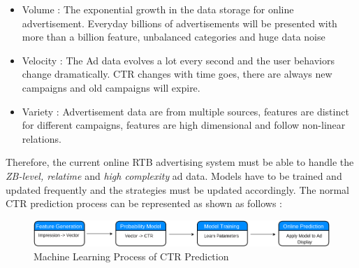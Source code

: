 \begin{itemize}
  \item Volume : The exponential growth in the data storage for online advertisement. Everyday billions of advertisements will be presented with more than a billion feature, unbalanced categories and huge data noise
  \item Velocity : The Ad data evolves a lot every second and the user behaviors change dramatically. CTR changes with time goes, there are always new campaigns and old campaigns will expire.
  \item Variety : Advertisement data are from multiple sources, features are distinct for different campaigns, features are high dimensional and follow non-linear relations.
\end{itemize}
Therefore, the current online RTB advertising system must be able to handle the \textit{ZB-level, relatime } and \textit{high complexity} ad data. Models have to be trained and updated frequently and the strategies must be updated accordingly. 
The normal CTR prediction process can be represented as shown as follows :
\begin{figure}[h]
\centering
\includegraphics[width=\columnwidth]{system.png}
\caption{Machine Learning Process of CTR Prediction}
\label{fig:system}
\end{figure}

